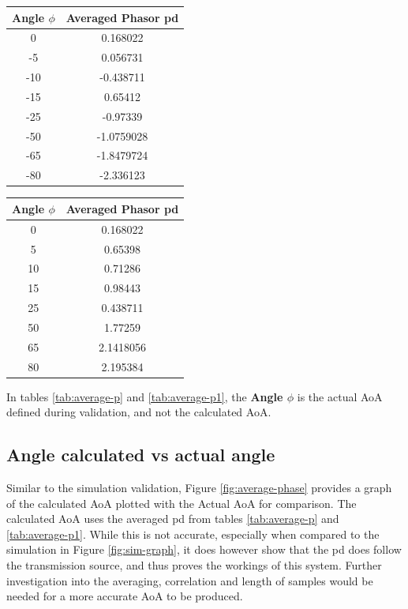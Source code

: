 \documentclass[class=report,11pt,crop=false]{standalone}
\begin{document}
\begin{minipage}[h!]{.45\linewidth}\centering
\begin{center}
    \begin{tabular}{c|c}
        \textbf{Angle $\phi$} & Averaged Phasor \gls{pd} \\
        \hline
        0 & 0.168022\\
        -5 & 0.056731 \\
        -10 & -0.438711 \\
        -15 & 0.65412\\
        -25 & -0.97339\\
        -50 & -1.0759028\\
        -65 & -1.8479724\\
        -80 & -2.336123 \\
    \end{tabular}
\end{center}
\end{minipage}%
\hspace{0.5cm}
\begin{minipage}[h!]{.45\linewidth}\centering
\begin{center}
    \begin{tabular}{c|c}
    \textbf{Angle $\phi$} & Averaged Phasor \gls{pd} \\
        \hline
        0 & 0.168022\\
        5 & 0.65398\\
        10 & 0.71286\\
        15 & 0.98443\\
        25 & 0.438711\\
        50 & 1.77259\\
        65 & 2.1418056\\
        80 & 2.195384\\
    \end{tabular}
\end{center}
\end{minipage}

In tables \ref{tab:average-p} and \ref{tab:average-p1}, the \textbf{Angle $\phi$} is the actual \gls{AoA} defined during validation, and not the calculated \gls{AoA}.

\subsection{Angle calculated vs actual angle}
Similar to the simulation validation, Figure \ref{fig:average-phase} provides a graph of the calculated \gls{AoA} plotted with the Actual \gls{AoA} for comparison. The calculated \gls{AoA} uses the averaged \gls{pd} from tables \ref{tab:average-p} and \ref{tab:average-p1}. While this is not accurate, especially when compared to the simulation in Figure \ref{fig:sim-graph}, it does however show that the \gls{pd} does follow the transmission source, and thus proves the workings of this system. Further investigation into the averaging, correlation and length of samples would be needed for a more accurate \gls{AoA} to be produced. 
\end{document}

